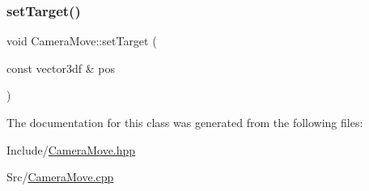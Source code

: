 \mbox{\label{class_camera_move_a94a1b0d11858511420b7a5d9d084f8c8}} 
\subsubsection{\texorpdfstring{setTarget()}{setTarget()}}
{\footnotesize\ttfamily void Camera\+Move\+::set\+Target (\begin{DoxyParamCaption}\item[{const vector3df \&}]{pos }\end{DoxyParamCaption})}



The documentation for this class was generated from the following files\+:\begin{DoxyCompactItemize}
\item 
Include/\mbox{\hyperlink{_camera_move_8hpp}{Camera\+Move.\+hpp}}\item 
Src/\mbox{\hyperlink{_camera_move_8cpp}{Camera\+Move.\+cpp}}\end{DoxyCompactItemize}
